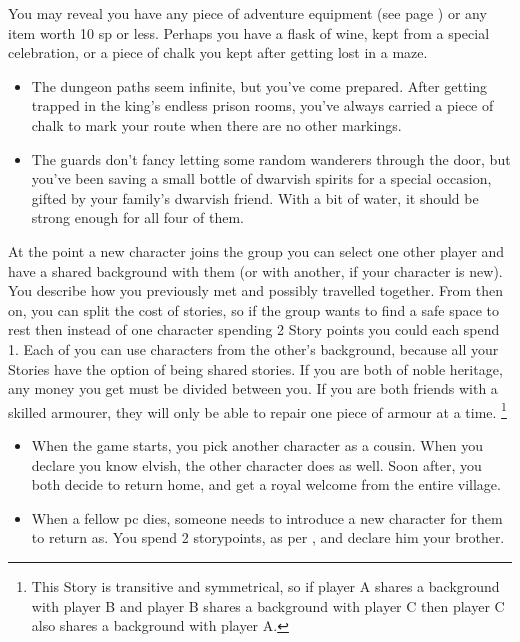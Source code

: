 \begin{multicols}{2}
You may reveal you have any piece of \gls{adventure} equipment (see page \pageref{adventuringequipment}) or any item worth 10 \gls{sp} or less.
Perhaps you have a flask of wine, kept from a special celebration, or a piece of chalk you kept after getting lost in a maze.

\begin{itemize}
\item The dungeon paths seem infinite, but you've come prepared.
After getting trapped in the king's endless prison rooms, you've always carried a piece of chalk to mark your route when there are no other markings.
\item The guards don't fancy letting some random wanderers through the door, but you've been saving a small bottle of dwarvish spirits for a special occasion, gifted by your family's dwarvish friend.
With a bit of water, it should be strong enough for all four of them.
\end{itemize}

\label{sharedstories}%
At the point a new character joins the group you can select one other player and have a shared background with them (or with another, if your character is new).
You describe how you previously met and possibly travelled together.
From then on, you can split the cost of stories, so if the group wants to find a safe space to rest then instead of one character spending 2 Story points you could each spend 1.
Each of you can use characters from the other's background, because all your Stories have the option of being shared stories.
If you are both of noble heritage, any money you get must be divided between you.
If you are both friends with a skilled armourer, they will only be able to repair one piece of armour at a time.%
\footnote{This Story is transitive and symmetrical, so if player A shares a background with player B and player B shares a background with player C then player C also shares a background with player A.}

\begin{itemize}
\item
When the game starts, you pick another character as a cousin.
When you declare you know elvish, the other character does as well.
Soon after, you both decide to return home, and get a royal welcome from the entire village.
\item
When a fellow \gls{pc} dies, someone needs to introduce a new character for them to return as.
You spend 2 \glspl{storypoint}, as per , and declare him your brother.
\end{itemize}


\end{multicols}
